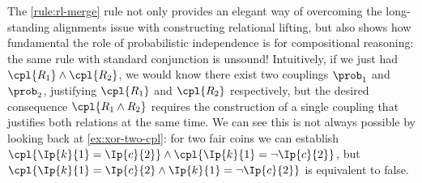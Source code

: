 The \ref{rule:rl-merge} rule not only provides an elegant way of overcoming
the long-standing alignments issue with constructing relational lifting,
but also shows how fundamental the role of probabilistic independence is
for compositional reasoning:
the same rule with standard conjunction is unsound!
Intuitively, if we just had $ \cpl{R_1} \land \cpl{R_2} $,
we would know there exist two couplings
$\prob_1$ and $\prob_2$,
justifying $\cpl{R_1}$ and $\cpl{R_2}$ respectively,
but the desired consequence $\cpl{R_1 \land R_2}$
requires the construction of a single coupling that justifies both relations
at the same time.
We can see this is not always possible by looking back at
\eqref{ex:xor-two-cpl}:
for two fair coins we can establish
$
  \cpl{ \Ip{k}{1} = \Ip{c}{2} }
  \land
  \cpl{ \Ip{k}{1} = \neg\Ip{c}{2} }
$,
but
$
  \cpl{
    \Ip{k}{1} = \Ip{c}{2}
    \land
    \Ip{k}{1} = \neg\Ip{c}{2}
  }
$ is equivalent to false.

